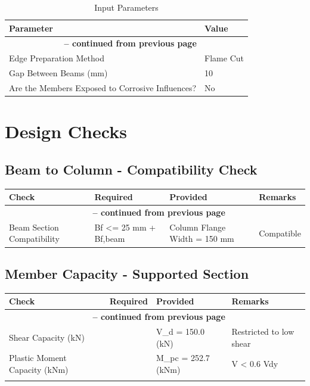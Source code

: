 \documentclass[12pt]{article}
\begin{document}
\begin{longtable}{ll}
\caption{Input Parameters}
\label{tab:input}
Parameter & Value \\ \hline
\endfirsthead
\multicolumn{2}{c}{{\bfseries \tablename\ \thetable{} -- continued from previous page}} \\
\endhead
\endfoot
\endlastfoot
Edge Preparation Method & Flame Cut \\
\hline
Gap Between Beams (mm) & 10 \\
\hline
Are the Members Exposed to Corrosive Influences? & No \\
\hline
\end{longtable}

\section{Design Checks}

\subsection{Beam to Column - Compatibility Check}

\begin{longtable}{llll}
\cellcolor{OsdagGreen} Check & \cellcolor{OsdagGreen} Required & \cellcolor{OsdagGreen} Provided & \cellcolor{OsdagGreen} Remarks \\ \hline
\endfirsthead
\multicolumn{4}{c}{{\bfseries \tablename\ \thetable{} -- continued from previous page}} \\
\endhead
\endfoot
\endlastfoot
Beam Section Compatibility & Bf <= 25 mm + Bf,beam & Column Flange Width = 150 mm & Compatible \\
\hline
\end{longtable}

\subsection{Member Capacity - Supported Section}

\begin{longtable}{llll}
\cellcolor{OsdagGreen} Check & \cellcolor{OsdagGreen} Required & \cellcolor{OsdagGreen} Provided & \cellcolor{OsdagGreen} Remarks \\ \hline
\endfirsthead
\multicolumn{4}{c}{{\bfseries \tablename\ \thetable{} -- continued from previous page}} \\
\endhead
\endfoot
\endlastfoot
Shear Capacity (kN) &  & V\_d = 150.0 (kN) & Restricted to low shear \\
\hline
Plastic Moment Capacity (kNm) &  & M\_pc = 252.7 (kNm) & V < 0.6 Vdy \\
\hline
 &  &  &  \\
\hline
\end{longtable}
\end{document}
